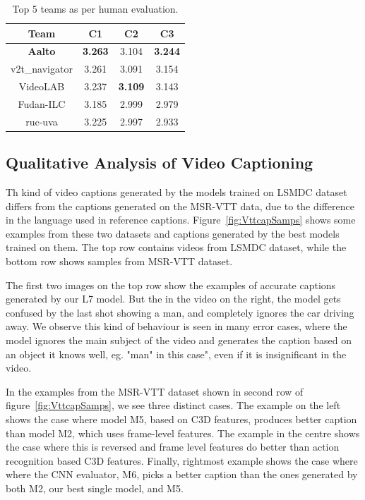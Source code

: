 \begin{table}[th]
  \centering
  \newcommand{\bs}{\small\bf}
  \begin{tabular}{||c|c|c|c|}
    \hline\hline
    \bf Team  &\bs C1 &\bs C2 &\bs C3 \\\hline\hline
    \bf Aalto      & \bf3.263 & 3.104 & \bf3.244\\
    v2t\_navigator & 3.261 & 3.091 & 3.154 \\
    VideoLAB       & 3.237 & \bf3.109 & 3.143 \\
    Fudan-ILC      & 3.185 & 2.999 & 2.979 \\
    ruc-uva        & 3.225 & 2.997 & 2.933 \\\hline
    \hline
  \end{tabular}
  \caption{Top 5 teams as per human evaluation.}
  \label{tab:resultsTestHum}
\end{table}


\subsection{Qualitative Analysis of Video Captioning}
Th kind of video captions generated by the models trained on LSMDC dataset
differs from the captions generated on the MSR-VTT data, due to the difference
in the language used in reference captions.
Figure~\ref{fig:VttcapSamps} shows some examples from these two datasets and
captions generated by the best models trained on them.
The top row contains videos from LSMDC dataset, while the bottom row shows
samples from MSR-VTT dataset. 

The first two images on the top row show the examples of accurate captions
generated by our L7 model.
But the in the video on the right, the model gets confused by the last shot
showing a man, and completely ignores the car driving away.
We observe this kind of behaviour is seen in many error cases, where the model
ignores the main subject of the video and generates the caption based on an
object it knows well, eg. "man" in this case", even if it is insignificant in
the video.

In the examples from the MSR-VTT dataset shown in second row of
figure~\ref{fig:VttcapSamps}, we see three distinct cases.
The example on the left shows the case where model M5, based on C3D features,
produces better caption than model M2, which uses frame-level features.
The example in the centre shows the case where this is reversed and frame level
features do better than action recognition based C3D features.
Finally, rightmost example shows the case where where the CNN evaluator, M6,
picks a better caption than the ones generated by both M2, our best single
model, and M5.


